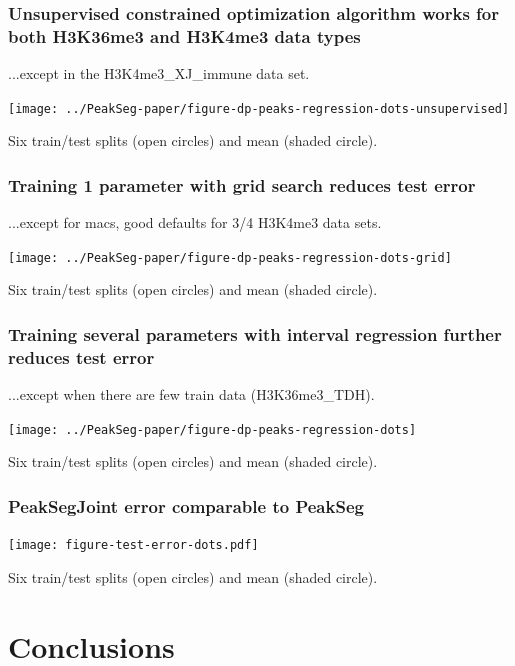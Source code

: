 \documentclass{beamer}
\begin{document}
\begin{frame}
  \frametitle{Unsupervised constrained optimization algorithm works
    for both H3K36me3 and H3K4me3 data types}

  ...except in the H3K4me3\_XJ\_immune data set.

  \texttt{[image: ../PeakSeg-paper/figure-dp-peaks-regression-dots-unsupervised]}
  
  Six train/test splits (open circles) and mean (shaded circle).
\end{frame}

\begin{frame}
  \frametitle{Training 1 parameter with grid search reduces test error}

  ...except for macs, good defaults for 3/4 H3K4me3 data sets.

  \texttt{[image: ../PeakSeg-paper/figure-dp-peaks-regression-dots-grid]}

  Six train/test splits (open circles) and mean (shaded circle).
\end{frame}

\begin{frame}
  \frametitle{Training several parameters with interval regression 
    further reduces test error}

  ...except when there are few train data (H3K36me3\_TDH).

  \texttt{[image: ../PeakSeg-paper/figure-dp-peaks-regression-dots]}

  Six train/test splits (open circles) and mean (shaded circle).
\end{frame}


\begin{frame}
  \frametitle{PeakSegJoint error comparable to PeakSeg}

  \texttt{[image: figure-test-error-dots.pdf]}

  Six train/test splits (open circles) and mean (shaded circle).
\end{frame}

\section{Conclusions}
\end{document}
